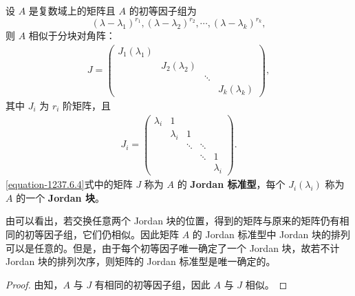 \documentclass[../../main.tex]{subfiles}%
\begin{document}
\begin{theorem}[Jordan标准型]\label{theorem:Jordan标准型}
设 $A$ 是复数域上的矩阵且 $A$ 的初等因子组为
\[
(\lambda - \lambda_1)^{r_1}, (\lambda - \lambda_2)^{r_2}, \cdots, (\lambda - \lambda_k)^{r_k},
\]
则 $A$ 相似于分块对角阵：
\begin{align}
J = \begin{pmatrix}
J_1(\lambda_1) & & & \\
& J_2(\lambda_2) & & \\
& & \ddots & \\
& & & J_k(\lambda_k)
\end{pmatrix},
\label{equation-1237.6.4}
\end{align}
其中 $J_i$ 为 $r_i$ 阶矩阵，且
\begin{align*}
J_i = \begin{pmatrix}
\lambda_i & 1 & & & \\
& \lambda_i & 1 & & \\
& & \ddots & \ddots & \\
& & & \ddots & 1 \\
& & & & \lambda_i
\end{pmatrix}.
\end{align*}
\eqref{equation-1237.6.4}式中的矩阵 $J$ 称为 $A$ 的\textbf{ Jordan 标准型}，每个 $J_i(\lambda_i)$ 称为 $A$ 的一个 \textbf{ Jordan 块}。 
\end{theorem}
\begin{remark}
由可以看出，若交换任意两个 Jordan 块的位置，得到的矩阵与原来的矩阵仍有相同的初等因子组，它们仍相似。因此矩阵 $A$ 的 Jordan 标准型中 Jordan 块的排列可以是任意的。但是，由于每个初等因子唯一确定了一个 Jordan 块，故若不计 Jordan 块的排列次序，则矩阵的 Jordan 标准型是唯一确定的。 
\end{remark}
\begin{proof}
由知，$A$ 与 $J$ 有相同的初等因子组，因此 $A$ 与 $J$ 相似。
\end{proof}
\end{document}
